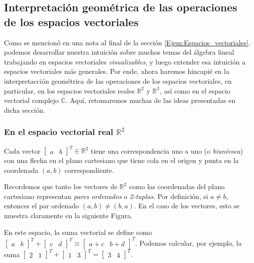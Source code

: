 \documentclass[12pt]{article}
\begin{document}
\newpage
\subsection{Interpretación geométrica de las operaciones de los espacios vectoriales}

Como se mencionó en una nota al final de la sección \ref{Ejem:Espacios_vectoriales}, podemos desarrollar nuestra intuición sobre muchos temas del álgebra lineal trabajando en espacios vectoriales \emph{visualizables}, y luego extender esa intuición a espacios vectoriales más generales. Por ende, ahora haremos hincapié en la interpretacción geométrica de las operaciones de los espacios vectoriales, en particular, en los espacios vectoriales reales $\mathbb{R}^2$ y $\mathbb{R}^3$, así como en el espacio vectorial complejo $\mathbb{C}$. Aquí, retomaremos muchas de las ideas presentadas en dicha sección.

\subsubsection{En el espacio vectorial real $\mathbb{R}^2$} \label{Ejem:En_R^2}

Cada vector $\begin{bmatrix}a&b\end{bmatrix}^T \in \mathbb{R}^2$ tiene una correspondencia uno a uno (o \emph{biunívoca}) con una flecha en el plano cartesiano que tiene cola en el origen y punta en la coordenada $(a,b)$ correspondiente.


Recordemos que tanto los vectores de $\mathbb{R}^2$ como las coordenadas del plano cartesiano representan \emph{pares ordenados} o  \emph{2-tuplas}. Por definición, si $a\neq b$, entonces el par ordenado $(a,b)\neq(b,a)$. En el caso de los vectores, esto se muestra claramente en la siguiente Figura.


En este espacio, la suma vectorial se define como $\begin{bmatrix}a&b\end{bmatrix}^T+\begin{bmatrix}c&d\end{bmatrix}^T\equiv\begin{bmatrix}a+c&b+d\end{bmatrix}^T$. Podemos calcular, por ejemplo, la suma $\begin{bmatrix}2&1\end{bmatrix}^T+\begin{bmatrix}1&3\end{bmatrix}^T=\begin{bmatrix}3&4\end{bmatrix}^T$.
\end{document}
